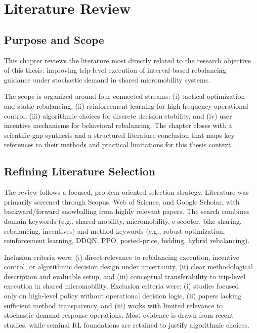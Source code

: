 \chapter{Literature Review}
\label{chapter:literature-review}

\section{Purpose and Scope}

This chapter reviews the literature most directly related to the research objective of this thesis: improving trip-level execution of interval-based rebalancing guidance under stochastic demand in shared micromobility systems. 

The scope is organized around four connected streams: (i) tactical optimization and static rebalancing, (ii) reinforcement learning for high-frequency operational control, (iii) algorithmic choices for discrete decision stability, and (iv) user incentive mechanisms for behavioral rebalancing. The chapter closes with a scientific-gap synthesis and a structured literature conclusion that maps key references to their methods and practical limitations for this thesis context.

\section{Refining Literature Selection}

The review follows a focused, problem-oriented selection strategy. Literature was primarily screened through Scopus, Web of Science, and Google Scholar, with backward/forward snowballing from highly relevant papers. The search combines domain keywords (e.g., shared mobility, micromobility, e-scooter, bike-sharing, rebalancing, incentives) and method keywords (e.g., robust optimization, reinforcement learning, DDQN, PPO, posted-price, bidding, hybrid rebalancing).

Inclusion criteria were: (i) direct relevance to rebalancing execution, incentive control, or algorithmic decision design under uncertainty, (ii) clear methodological description and evaluable setup, and (iii) conceptual transferability to trip-level execution in shared micromobility. Exclusion criteria were: (i) studies focused only on high-level policy without operational decision logic, (ii) papers lacking sufficient method transparency, and (iii) works with limited relevance to stochastic demand-response operations. Most evidence is drawn from recent studies, while seminal RL foundations are retained to justify algorithmic choices.

